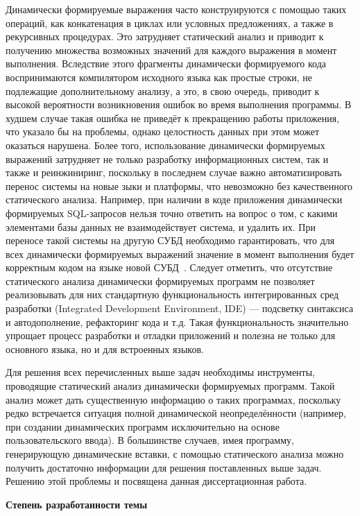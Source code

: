 Динамически формируемые выражения часто конструируются с помощью таких операций, как конкатенация в циклах или условных предложениях, а также в рекурсивных процедурах. Это затрудняет статический анализ и приводит к получению множества возможных значений для каждого выражения в момент выполнения. Вследствие этого фрагменты динамически формируемого кода воспринимаются компилятором исходного языка как простые строки, не подлежащие дополнительному анализу, а это, в свою очередь, приводит к высокой вероятности возникновения ошибок во время выполнения программы. В худшем случае такая ошибка не приведёт к прекращению работы приложения, что указало бы на проблемы, однако целостность данных при этом может оказаться нарушена. Более того, использование динамически формируемых выражений затрудняет не только разработку информационных систем, так и также и реинжиниринг, поскольку в последнем случае важно автоматизировать перенос системы на новые зыки и платформы, что невозможно без качественного статического анализа. Например, при наличии в коде приложения динамически формируемых SQL-запросов нельзя точно ответить на вопрос о том, с какими элементами базы данных не взаимодействует система, и удалить их. При переносе такой системы на другую СУБД необходимо гарантировать, что для всех динамически формируемых выражений значение в момент выполнения будет корректным кодом на языке новой СУБД~\cite{JSquash}. Следует отметить, что отсутствие статического анализа динамически формируемых программ не позволяет реализовывать для них стандартную функциональность интегрированных сред разработки (Integrated Development Environment, IDE) --- подсветку синтаксиса и автодополнение, рефакторинг кода и т.д. Такая функциональность значительно упрощает процесс разработки и отладки приложений и полезна не только для основного языка, но и для встроенных языков. 

Для решения всех перечисленных выше задач необходимы инструменты, проводящие статический анализ динамически формируемых программ. Такой анализ может дать существенную информацию о таких программах, поскольку редко встречается ситуация полной динамической неопределённости (например, при создании динамических программ исключительно на основе пользовательского ввода). В большинстве случаев, имея программу, генерирующую динамические вставки, с помощью статического анализа можно получить достаточно информации для решения поставленных выше задач. Решению этой проблемы и посвящена данная диссертационная работа. 


\textbf{Степень разработанности темы}

